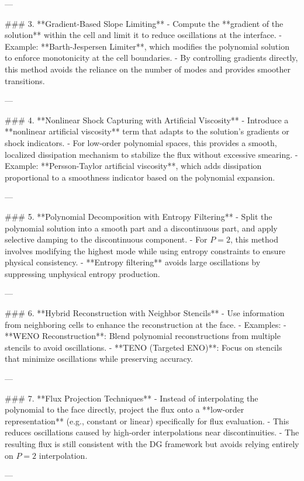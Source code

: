 ---

### 3. **Gradient-Based Slope Limiting**
   - Compute the **gradient of the solution** within the cell and limit it to reduce oscillations at the interface.
   - Example: **Barth-Jespersen Limiter**, which modifies the polynomial solution to enforce monotonicity at the cell boundaries.
   - By controlling gradients directly, this method avoids the reliance on the number of modes and provides smoother transitions.

---

### 4. **Nonlinear Shock Capturing with Artificial Viscosity**
   - Introduce a **nonlinear artificial viscosity** term that adapts to the solution's gradients or shock indicators.
   - For low-order polynomial spaces, this provides a smooth, localized dissipation mechanism to stabilize the flux without excessive smearing.
   - Example: **Persson-Taylor artificial viscosity**, which adds dissipation proportional to a smoothness indicator based on the polynomial expansion.

---

### 5. **Polynomial Decomposition with Entropy Filtering**
   - Split the polynomial solution into a smooth part and a discontinuous part, and apply selective damping to the discontinuous component.
   - For \( P = 2 \), this method involves modifying the highest mode while using entropy constraints to ensure physical consistency.
   - **Entropy filtering** avoids large oscillations by suppressing unphysical entropy production.

---

### 6. **Hybrid Reconstruction with Neighbor Stencils**
   - Use information from neighboring cells to enhance the reconstruction at the face.
   - Examples:
     - **WENO Reconstruction**: Blend polynomial reconstructions from multiple stencils to avoid oscillations.
     - **TENO (Targeted ENO)**: Focus on stencils that minimize oscillations while preserving accuracy.

---

### 7. **Flux Projection Techniques**
   - Instead of interpolating the polynomial to the face directly, project the flux onto a **low-order representation** (e.g., constant or linear) specifically for flux evaluation.
   - This reduces oscillations caused by high-order interpolations near discontinuities.
   - The resulting flux is still consistent with the DG framework but avoids relying entirely on \( P = 2 \) interpolation.

---

